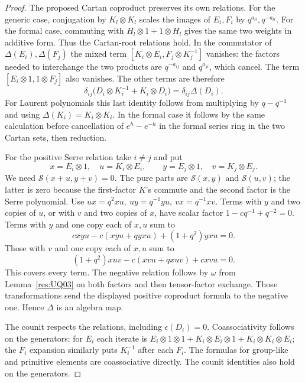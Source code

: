 \documentclass[11pt,oneside,openany]{book}
\theoremstyle{definition}
\theoremstyle{remark}
\begin{document}
\begin{proof}
The proposed Cartan coproduct preserves its own relations.
For the generic case, conjugation by \(K_l\otimes K_l\)
scales the images of \(E_i,F_i\) by \(q^{a_{li}},q^{-a_{li}}\).
For the formal case, commuting with \(H_l\otimes1+1\otimes H_l\)
gives the same two weights in additive form. Thus the
Cartan-root relations hold. In the commutator of
\(\Delta(E_i),\Delta(F_j)\) the mixed term
\([K_i\otimes E_i,F_j\otimes K_j^{-1}]\) vanishes:
the factors needed to interchange the two products
are \(q^{-a_{ij}}\) and \(q^{a_{ji}}\), which cancel.
The term \([E_i\otimes1,1\otimes F_j]\) also vanishes.
The other terms are therefore
\[
 \delta_{ij}\bigl(D_i\otimes K_i^{-1}+K_i\otimes D_i\bigr)
       =\delta_{ij}\Delta(D_i).
\]
For Laurent polynomials this last identity follows from
multiplying by \(q-q^{-1}\) and using \(\Delta(K_i)=K_i\otimes K_i\).
In the formal case it follows by the same calculation
before cancellation of \(e^h-e^{-h}\) in the
formal series ring in the two Cartan sets, then reduction.

For the positive Serre relation take \(i\ne j\) and put
\[
 x=E_i\otimes1,\quad u=K_i\otimes E_i,\qquad
 y=E_j\otimes1,\quad v=K_j\otimes E_j.
\]
We need \(\mathcal S(x+u,y+v)=0\). The pure parts are
\(\mathcal S(x,y)\) and \(\mathcal S(u,v)\); the latter
is zero because the first-factor \(K\)'s commute and
the second factor is the Serre polynomial.
Use \(ux=q^2xu,\ uy=q^{-1}yu,\ vx=q^{-1}xv\).
Terms with \(y\) and two copies of \(u\), or with \(v\) and two
copies of \(x\), have scalar factor \(1-cq^{-1}+q^{-2}=0\).
Terms with \(y\) and one copy each of \(x,u\) sum to
\[
 cxyu-c(xyu+qyxu)+(1+q^2)yxu=0.
\]
Those with \(v\) and one copy each of \(x,u\) sum to
\[
 (1+q^2)xuv-c(xvu+qxuv)+cxvu=0 .
\]
This covers every term. The negative relation follows
by \(\omega\) from Lemma~\ref{res:UQ03} on both factors
and then tensor-factor exchange. Those transformations
send the displayed positive coproduct formula to the
negative one. Hence \(\Delta\) is an algebra map.

The counit respects the relations, including \(\epsilon(D_i)=0\).
Coassociativity follows on the generators: for \(E_i\) each
iterate is \(E_i\otimes1\otimes1+K_i\otimes E_i\otimes1+
K_i\otimes K_i\otimes E_i\); the \(F_i\) expansion similarly
puts \(K_i^{-1}\) after each \(F_i\). The formulas for group-like
and primitive elements are coassociative directly. The counit
identities also hold on the generators.


\end{proof}
\end{document}
